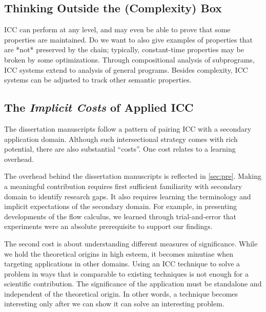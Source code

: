 \subsection{Thinking Outside the (Complexity) Box}
\label{subsec:res-other-props}

ICC can perform at any level, and may even be able to prove that some properties
are maintained. Do we want to also give examples of properties that are *not*
preserved by the chain; typically, constant-time properties may be broken by
some optimizations. Through compositional analysis of subprograms, ICC systems
extend to analysis of general programs. Besides complexity, ICC systems can be
adjusted to track other semantic properties.

\subsection[The Implicit Costs of Applied ICC]
{The \emph{Implicit Costs} of Applied ICC}
\label{subsec:res-meta}


The dissertation manuscripts follow a pattern of pairing ICC with a secondary
application domain. Although such intersectional strategy comes with rich
potential, there are also substantial \enquote{costs}. One cost relates to a
learning overhead.

The overhead behind the dissertation manuscripts is reflected in
\autoref{sec:pre}. Making a meaningful contribution requires first sufficient
familiarity with secondary domain to identify research gaps. It also requires
learning the terminology and implicit expectations of the secondary domain. For
example, in presenting developments of the flow calculus, we learned through
trial-and-error that experiments were an absolute prerequisite to support our
findings.

The second cost is about understanding different measures of significance. While
we hold the theoretical origins in high esteem, it becomes minutiae when
targeting applications in other domains. Using an ICC technique to solve a
problem in ways that is comparable to existing techniques is not enough for a
scientific contribution. The significance of the application must be standalone
and independent of the theoretical origin. In other words, a technique becomes
interesting only after we can show it can solve an interesting problem.

